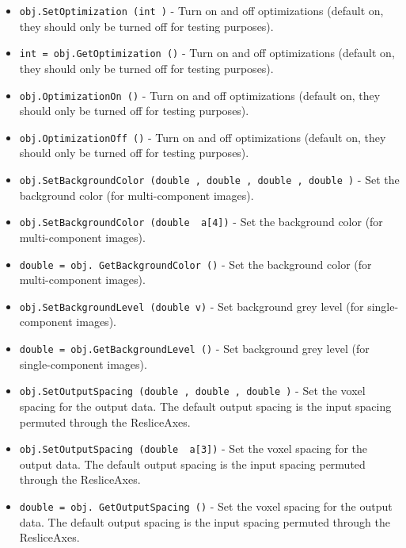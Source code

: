 \begin{itemize}
\item  \verb|obj.SetOptimization (int )| -  Turn on and off optimizations (default on, they should only be
 turned off for testing purposes). 

\item  \verb|int = obj.GetOptimization ()| -  Turn on and off optimizations (default on, they should only be
 turned off for testing purposes). 

\item  \verb|obj.OptimizationOn ()| -  Turn on and off optimizations (default on, they should only be
 turned off for testing purposes). 

\item  \verb|obj.OptimizationOff ()| -  Turn on and off optimizations (default on, they should only be
 turned off for testing purposes). 

\item  \verb|obj.SetBackgroundColor (double , double , double , double )| -  Set the background color (for multi-component images).

\item  \verb|obj.SetBackgroundColor (double  a[4])| -  Set the background color (for multi-component images).

\item  \verb|double = obj. GetBackgroundColor ()| -  Set the background color (for multi-component images).

\item  \verb|obj.SetBackgroundLevel (double v)| -  Set background grey level (for single-component images).

\item  \verb|double = obj.GetBackgroundLevel ()| -  Set background grey level (for single-component images).

\item  \verb|obj.SetOutputSpacing (double , double , double )| -  Set the voxel spacing for the output data.  The default output
 spacing is the input spacing permuted through the ResliceAxes.

\item  \verb|obj.SetOutputSpacing (double  a[3])| -  Set the voxel spacing for the output data.  The default output
 spacing is the input spacing permuted through the ResliceAxes.

\item  \verb|double = obj. GetOutputSpacing ()| -  Set the voxel spacing for the output data.  The default output
 spacing is the input spacing permuted through the ResliceAxes.


\end{itemize}
